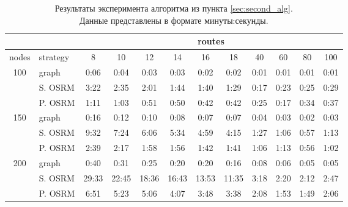 \begin{table}[ht!]
    \centering
    \caption{Результаты эксперимента алгоритма из пункта \ref{sec:second_alg}.\\
        Данные представлены в формате минуты:секунды.}
    \label{tab:second_alg}
    \small
    \begin{tabular}{|c|l|c|c|c|c|c|c|l|l|l|c|}
        \hline
        \multicolumn{1}{|l|}{}      &          & \multicolumn{10}{c|}{routes}                                                                                                       \\ \hline
        \multicolumn{1}{|l|}{nodes} & strategy & 8     & 10    & 12    & 14    & 16    & 18    & \multicolumn{1}{c|}{40} & \multicolumn{1}{c|}{60} & \multicolumn{1}{c|}{80} & 100  \\ \hline
        \multirow{3}{*}{100}        & graph    & 0:06  & 0:04  & 0:03  & 0:03  & 0:02  & 0:02  & 0:01                    & 0:01                    & 0:01                    & 0:01 \\ \cline{2-12} 
        & S. OSRM  & 3:22  & 2:35  & 2:01  & 1:44  & 1:40  & 1:29  & 0:17                    & 0:23                    & 0:25                    & 0:29 \\ \cline{2-12} 
        & P. OSRM  & 1:11  & 1:03  & 0:51  & 0:50  & 0:42  & 0:42  & 0:25                    & 0:17                    & 0:34                    & 0:37 \\ \hline
        \multirow{3}{*}{150}        & graph    & 0:16  & 0:12  & 0:10  & 0:08  & 0:07  & 0:07  & 0:04                    & 0:03                    & 0:02                    & 0:03 \\ \cline{2-12} 
        & S. OSRM  & 9:32  & 7:24  & 6:06  & 5:34  & 4:59  & 4:15  & 1:27                    & 1:06                    & 0:57                    & 1:13 \\ \cline{2-12} 
        & P. OSRM  & 2:39  & 2:17  & 1:58  & 1:56  & 1:42  & 1:41  & 1:06                    & 1:13                    & 0:56                    & 1:02 \\ \hline
        \multirow{3}{*}{200}        & graph    & 0:40  & 0:31  & 0:25  & 0:20  & 0:20  & 0:16  & 0:08                    & 0:06                    & 0:05                    & 0:05 \\ \cline{2-12} 
        & S. OSRM  & 29:33 & 22:45 & 18:36 & 16:43 & 13:53 & 11:35 & 3:18                    & 2:20                    & 2:12                    & 2:47 \\ \cline{2-12} 
        & P. OSRM  & 6:51  & 5:23  & 5:06  & 4:07  & 3:48  & 3:38  & 2:08                    & 1:53                    & 1:49                    & 2:06 \\ \hline

\end{tabular}
\end{table}
